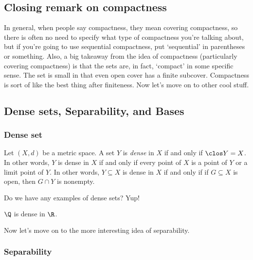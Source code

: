 \documentclass[class=article, crop=false]{standalone}
\begin{document}
\subsection{Closing remark on compactness}

In general, when people say compactness, they mean covering compactness, so there is often no need to specify what type of compactness you're talking about, but if you're going to use sequential compactness, put `sequential' in parentheses or something. Also, a big takeaway from the idea of compactness (particularly covering compactness) is that the sets are, in fact, `compact' in some specific sense. The set is small in that even open cover has a finite subcover. Compactness is sort of like the best thing after finiteness. Now let's move on to other cool stuff.










\subsection{Dense sets, Separability, and Bases}

\subsubsection*{Dense set}

\begin{defn}
    Let $(X,d)$ be a metric space. A set $Y$ is \textit{dense} in $X$ if and only if $\clos Y = X$. In other words, $Y$ is dense in $X$ if and only if every point of $X$ is a point of $Y$ or a limit point of $Y$. In other words, $Y \subseteq X$ is dense in $X$ if and only if if $G \subseteq X$ is open, then $G \cap Y$ is nonempty.
\end{defn}

Do we have any examples of dense sets? Yup!
\begin{ex}
    $\Q$ is dense in $\R$.
\end{ex}

Now let's move on to the more interesting idea of separability.









\subsubsection*{Separability}
\end{document}

